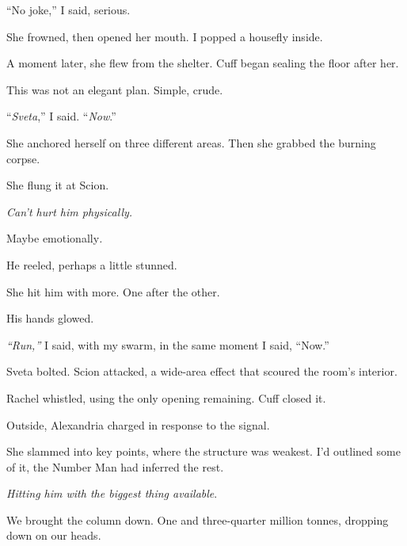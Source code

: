 ``No joke,'' I said, serious.



She frowned, then opened her mouth.  I popped a housefly inside.



A moment later, she flew from the shelter.  Cuff began sealing the floor after her.



This was not an elegant plan.  Simple, crude.



``\emph{Sveta},'' I said.  ``\emph{Now}.''



She anchored herself on three different areas.  Then she grabbed the burning corpse.



She flung it at Scion.



\emph{Can't hurt him physically.}



Maybe emotionally\emph{.}



He reeled, perhaps a little stunned.



She hit him with more.  One after the other.



His hands glowed.



\emph{``Run,'' }I said, with my swarm, in the same moment I said, ``Now.''



Sveta bolted.  Scion attacked, a wide-area effect that scoured the room's interior.



Rachel whistled, using the only opening remaining.  Cuff closed it.



Outside, Alexandria charged in response to the signal.



She slammed into key points, where the structure was weakest.  I'd outlined some of it, the Number Man had inferred the rest.



\emph{Hitting him with the biggest thing available}.



We brought the column down.  One and three-quarter million tonnes, dropping down on our heads.



